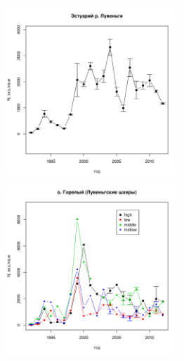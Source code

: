 \documentclass[12pt, a4paper]{disser}
\begin{document}
	\begin{figure}[h]

	\begin{minipage}[b]{.46\linewidth}
	\begin{center}
		\includegraphics[width=65mm]{../White_Sea/Estuatiy_Luvenga/N2_dynamic.pdf}
	\end{center}
	\end{minipage}
%
	\hfil %
%
	\begin{minipage}[b]{.46\linewidth}
	\begin{center}
		\includegraphics[width=65mm]{../White_Sea/Luvenga_Goreliy/N2_dynamic.pdf}
	\end{center}
	\end{minipage}
	\begin{minipage}[b]{.46\linewidth}
	\begin{center}

\end{center}
\end{minipage}
\end{figure}
\end{document}
